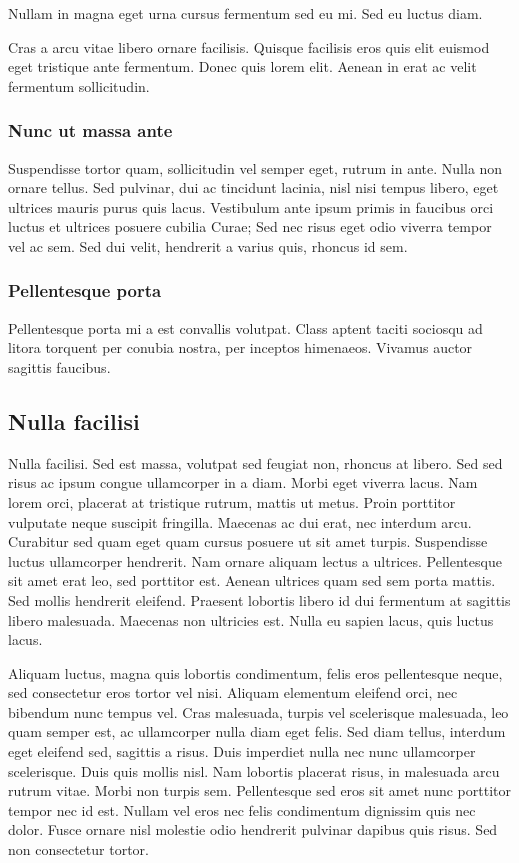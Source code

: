 Nullam in magna eget urna cursus fermentum sed eu mi. Sed eu luctus diam.

Cras a arcu vitae libero ornare facilisis. Quisque facilisis eros quis elit
euismod eget tristique ante fermentum. Donec quis lorem elit. Aenean in erat ac
velit fermentum sollicitudin.

\subsubsection{Nunc ut massa ante}

Suspendisse tortor quam, sollicitudin vel semper eget, rutrum in ante. Nulla non
ornare tellus. Sed pulvinar, dui ac tincidunt lacinia, nisl nisi tempus libero,
eget ultrices mauris purus quis lacus. Vestibulum ante ipsum primis in faucibus
orci luctus et ultrices posuere cubilia Curae; Sed nec risus eget odio viverra
tempor vel ac sem. Sed dui velit, hendrerit a varius quis, rhoncus id sem.

\subsubsection{Pellentesque porta}

Pellentesque porta mi a est convallis volutpat. Class aptent taciti sociosqu ad
litora torquent per conubia nostra, per inceptos himenaeos. Vivamus auctor
sagittis faucibus.

\subsection{Nulla facilisi}

Nulla facilisi. Sed est massa, volutpat sed feugiat non, rhoncus at libero. Sed
sed risus ac ipsum congue ullamcorper in a diam. Morbi eget viverra lacus. Nam
lorem orci, placerat at tristique rutrum, mattis ut metus. Proin porttitor
vulputate neque suscipit fringilla. Maecenas ac dui erat, nec interdum arcu.
Curabitur sed quam eget quam cursus posuere ut sit amet turpis. Suspendisse
luctus ullamcorper hendrerit. Nam ornare aliquam lectus a ultrices. Pellentesque
sit amet erat leo, sed porttitor est. Aenean ultrices quam sed sem porta mattis.
Sed mollis hendrerit eleifend. Praesent lobortis libero id dui fermentum at
sagittis libero malesuada. Maecenas non ultricies est. Nulla eu sapien lacus,
quis luctus lacus.

Aliquam luctus, magna quis lobortis condimentum, felis eros pellentesque neque,
sed consectetur eros tortor vel nisi. Aliquam elementum eleifend orci, nec
bibendum nunc tempus vel. Cras malesuada, turpis vel scelerisque malesuada, leo
quam semper est, ac ullamcorper nulla diam eget felis. Sed diam tellus, interdum
eget eleifend sed, sagittis a risus. Duis imperdiet nulla nec nunc ullamcorper
scelerisque. Duis quis mollis nisl. Nam lobortis placerat risus, in malesuada
arcu rutrum vitae. Morbi non turpis sem. Pellentesque sed eros sit amet nunc
porttitor tempor nec id est. Nullam vel eros nec felis condimentum dignissim
quis nec dolor. Fusce ornare nisl molestie odio hendrerit pulvinar dapibus quis
risus. Sed non consectetur tortor.

